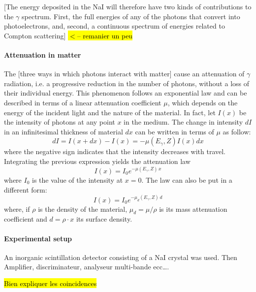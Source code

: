 [The energy deposited in the NaI will therefore have two kinds of contributions to the $\gamma$ spectrum.
First, the full energies of any of the photons that convert into photoelectrons, and, second, a continuous spectrum of energies related to Compton scattering] \hl{$<$-- remanier un peu}

\paragraph{Attenuation in matter}
The [three ways in which photons interact with matter] cause an attenuation of $\gamma$ radiation, i.e. a progressive reduction in the number of photons, without a loss of their individual energy.
This phenomenon follows an exponential law and can be described in terms of a linear attenuation coefficient $\mu$, which depends on the energy of the incident light and the nature of the material.
In fact, let $I(x)$ be the intensity of photons at any point $x$ in the medium.
The change in intensity $dI$ in an infinitesimal thickness of material $dx$ can be written in terms of $\mu$ as follow:
\begin{equation}
    dI = I(x + dx) - I(x) = -\mu(E_{\gamma}, Z) I(x) dx
\end{equation}
where the negative sign indicates that the intensity decreases with travel.
Integrating the previous expression yields the attenuation law
\begin{equation} \label{eq:attenuation_law}
    I(x) = I_0 e^{-\mu(E_{\gamma}, Z) \, x}
\end{equation}
where $I_0$ is the value of the intensity at $x=0$. 
The law can also be put in a different form:
\begin{equation} \label{eq:attenuation_law_density}
    I(x) = I_0 e^{-\mu_d(E_{\gamma}, Z) \, d}
\end{equation}
where, if $\rho$ is the density of the material, $\mu_d = \mu / \rho$ is its mass attenuation coefficient and $d = \rho \cdot x$ its surface density.

\paragraph{Experimental setup}
An inorganic scintillation detector consisting of a NaI crystal was used.
Then Amplifier, discriminateur, analyseur  multi-bande ecc\dots.

\hl{Bien expliquer les coincidences}